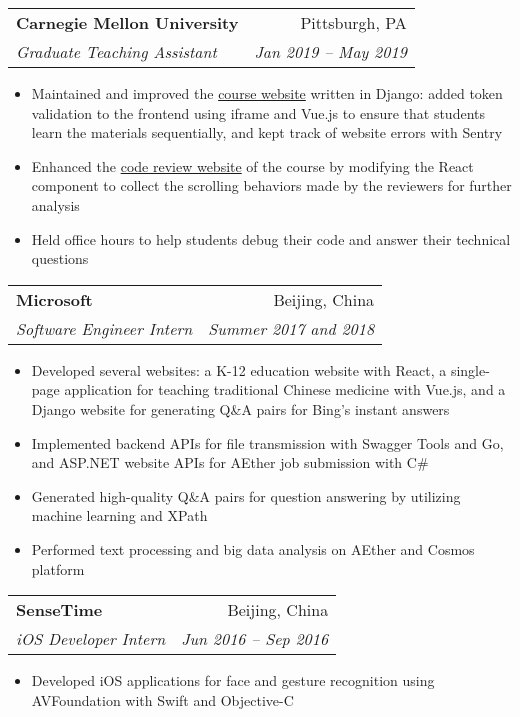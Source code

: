 \documentclass[letterpaper,11pt]{article}
\makeatletter
\newcommand{\resumeItemCustom}[1]{
  \item\small{
    #1 \vspace{-2pt}
  }
}
\newcommand{\resumeSubheading}[4]{
  \vspace{-1pt}\item
    \begin{tabular*}{0.97\textwidth}[t]{l@{\extracolsep{\fill}}r}
      \textbf{#1} & #2 \\
      \textit{\small#3} & \textit{\small #4} \\
    \end{tabular*}\vspace{-5pt}
}
\newcommand{\resumeItemListStart}{\begin{itemize}}
\newcommand{\resumeItemListEnd}{\end{itemize}\vspace{-5pt}}
\makeatother
\begin{document}
    \resumeSubheading
      {Carnegie Mellon University}{Pittsburgh, PA}
      {Graduate Teaching Assistant}{Jan 2019 -- May 2019}
      \resumeItemListStart
        \resumeItemCustom{
          Maintained and improved the \href{https://theproject.zone/}{course website} written in Django:
          added token validation to the frontend using iframe and Vue.js to ensure that
          students learn the materials sequentially, and kept track of website errors with Sentry
        }
        \resumeItemCustom{
          Enhanced the \href{https://codereview.theproject.zone/}{code review website} of the course by modifying the React component
          to collect the scrolling behaviors made by the reviewers for further analysis
        }
        \resumeItemCustom{
          Held office hours to help students debug their code and answer their technical questions
        }
      \resumeItemListEnd

    \resumeSubheading
      {Microsoft}{Beijing, China}
      {Software Engineer Intern}{Summer 2017 and 2018}
      \resumeItemListStart
        \resumeItemCustom{
          Developed several websites: a K-12 education website with React,
          a single-page application for teaching traditional Chinese medicine with Vue.js,
          and a Django website for generating Q\&A pairs for Bing's instant answers
        }
        \resumeItemCustom{
          Implemented backend APIs for file transmission with Swagger Tools and 
          Go, and ASP.NET website APIs for AEther job submission with C\#
        }
        \resumeItemCustom{
          Generated high-quality Q\&A pairs for question
          answering by utilizing machine learning and XPath
        }
        \resumeItemCustom{
          Performed text processing and big data analysis on AEther and Cosmos platform
        }
      \resumeItemListEnd

    \resumeSubheading
      {SenseTime}{Beijing, China}
      {iOS Developer Intern}{Jun 2016 -- Sep 2016}
      \resumeItemListStart
        \resumeItemCustom{
            Developed iOS applications for 
            face and gesture recognition using AVFoundation
            with Swift and Objective-C
        }
      \resumeItemListEnd
\end{document}

